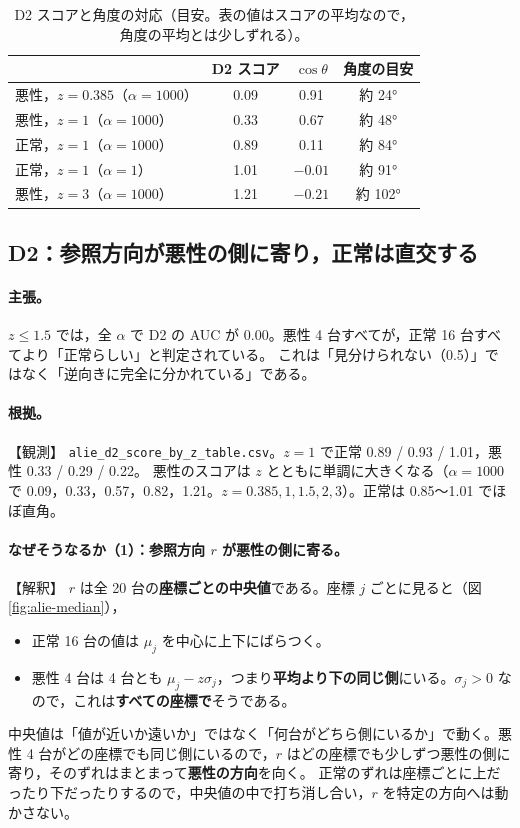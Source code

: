 \documentclass[a4j, dvipdfmx]{jsarticle}  %
\begin{document}
\begin{table}[H]
\centering
\caption{D2 スコアと角度の対応（目安。表の値はスコアの平均なので，角度の平均とは少しずれる）。}
\label{tab:alie-d2-angle}
\small
\begin{tabular}{@{}lccc@{}}
\toprule
 & D2 スコア & $\cos\theta$ & 角度の目安 \\
\midrule
悪性，$z = 0.385$（$\alpha = 1000$） & 0.09 & 0.91 & 約 24° \\
悪性，$z = 1$（$\alpha = 1000$） & 0.33 & 0.67 & 約 48° \\
正常，$z = 1$（$\alpha = 1000$） & 0.89 & 0.11 & 約 84° \\
正常，$z = 1$（$\alpha = 1$） & 1.01 & $-0.01$ & 約 91° \\
悪性，$z = 3$（$\alpha = 1000$） & 1.21 & $-0.21$ & 約 102° \\
\bottomrule
\end{tabular}
\end{table}

\subsection{D2：参照方向が悪性の側に寄り，正常は直交する}
\label{sec:claim-alie-d2}

\paragraph{主張。}
$z \le 1.5$ では，全 $\alpha$ で D2 の AUC が 0.00。悪性 4 台すべてが，正常 16 台すべてより「正常らしい」と判定されている。
これは「見分けられない（0.5）」ではなく「逆向きに完全に分かれている」である。

\paragraph{根拠。}【観測】
\texttt{alie\_d2\_score\_by\_z\_table.csv}。$z = 1$ で正常 0.89 / 0.93 / 1.01，悪性 0.33 / 0.29 / 0.22。
悪性のスコアは $z$ とともに単調に大きくなる（$\alpha = 1000$ で 0.09，0.33，0.57，0.82，1.21。$z = 0.385, 1, 1.5, 2, 3$）。正常は 0.85〜1.01 でほぼ直角。

\paragraph{なぜそうなるか（1）：参照方向 $r$ が悪性の側に寄る。}【解釈】
$r$ は全 20 台の\textbf{座標ごとの中央値}である。座標 $j$ ごとに見ると（図\ref{fig:alie-median}），
\begin{itemize}
  \item 正常 16 台の値は $\mu_j$ を中心に上下にばらつく。
  \item 悪性 4 台は 4 台とも $\mu_j - z\sigma_j$，つまり\textbf{平均より下の同じ側}にいる。$\sigma_j > 0$ なので，これは\textbf{すべての座標で}そうである。
\end{itemize}
中央値は「値が近いか遠いか」ではなく「何台がどちら側にいるか」で動く。悪性 4 台がどの座標でも同じ側にいるので，$r$ はどの座標でも少しずつ悪性の側に寄り，そのずれはまとまって\textbf{悪性の方向}を向く。
正常のずれは座標ごとに上だったり下だったりするので，中央値の中で打ち消し合い，$r$ を特定の方向へは動かさない。
\end{document}
